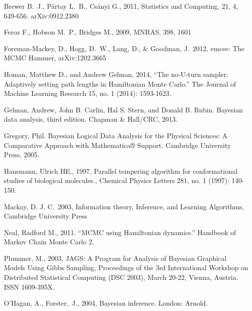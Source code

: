 \begin{thebibliography}{999}
 Brewer B.~J., P{\'a}rtay L.~B., Cs{\'a}nyi G., 2011,
Statistics and Computing, 21, 4, 649-656. arXiv:0912.2380

 Feroz F., Hobson M.~P., Bridges M., 2009, MNRAS, 398, 1601

 Foreman-Mackey, 
D., Hogg, D.~W., Lang, D., \& Goodman, J.\ 2012, emcee: The MCMC Hammer, arXiv:1202.3665 

Homan, Matthew D., and Andrew Gelman, 2014, ``The no-U-turn sampler: Adaptively setting path lengths in Hamiltonian Monte Carlo.'' The Journal of Machine Learning Research 15, no. 1 (2014): 1593-1623.

Gelman, Andrew, John B. Carlin, Hal S. Stern, and Donald B. Rubin. Bayesian data analysis, third edition. Chapman \& Hall/CRC, 2013.

Gregory, Phil. Bayesian Logical Data Analysis for the Physical Sciences: A Comparative Approach with Mathematica® Support. Cambridge University Press, 2005.

 Hansmann, Ulrich HE.,
1997, Parallel tempering algorithm for conformational studies of biological
molecules., Chemical Physics Letters 281, no. 1 (1997): 140-150.

 Mackay,
D. J. C.\ 2003, Information theory, Inference, and Learning
Algorithms, Cambridge University Press

Neal, Radford M., 2011. ``MCMC using Hamiltonian dynamics.''
Handbook of Markov Chain Monte Carlo 2.

Plummer, M., 2003, JAGS: A Program for Analysis of Bayesian Graphical Models
Using Gibbs Sampling, Proceedings of the 3rd International Workshop on
Distributed Statistical Computing (DSC 2003), March 20-22, Vienna, Austria.
ISSN 1609-395X.

O'Hagan, A., Forster,~J., 2004, Bayesian inference. London: Arnold.


\end{thebibliography}
